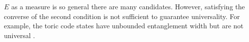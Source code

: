 \begin{remark}
$E$ as a measure is so general there are many candidates. However, satisfying the converse of the second condition is not sufficient to guarantee universality. For example, the toric code states have unbounded entanglement width but are not universal \cite{toric-not-universal}.
\end{remark}

